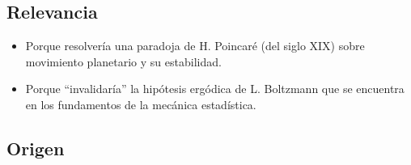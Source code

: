 \documentclass[8pt]{beamer}
\renewcommand{\>}{\rangle}
\newcommand{\<}{\langle}
\begin{document}
\subsection[Relevancia]{Relevancia}


\begin{frame}
{}
\vspace{-3cm}

\begin{itemize}
\pause
\item Porque resolvería una paradoja de H. Poincaré (del siglo XIX) sobre movimiento planetario y su estabilidad.
\pause
\item Porque ``invalidaría'' la hipótesis ergódica de L. Boltzmann que se encuentra en los fundamentos de la mecánica estadística.
\end{itemize}
\medskip
\pause
\begin{figure}[b]
\end{figure}

\vspace{-4cm}
\end{frame}

\subsection[Origen]{Origen}
\end{document}
